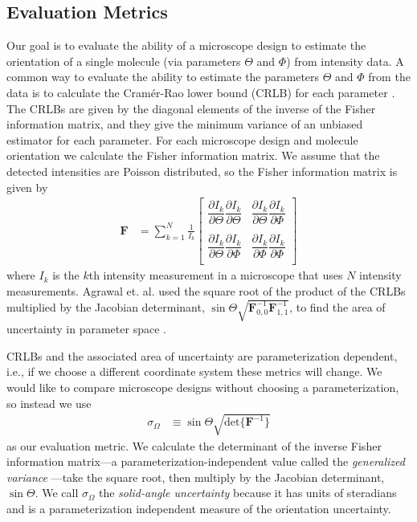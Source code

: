 \documentclass[10pt]{article}
\providecommand{\mb}[1]{\mathbf{#1}}
\begin{document}
\subsection{Evaluation Metrics}\label{metrics}
Our goal is to evaluate the ability of a microscope design to estimate the
orientation of a single molecule (via parameters $\Theta$ and $\Phi$) from
intensity data. A common way to evaluate the ability to estimate the parameters
$\Theta$ and $\Phi$ from the data is to calculate the Cram\'er-Rao lower bound
(CRLB) for each parameter \cite{kay1993}. The CRLBs are given by the diagonal
elements of the inverse of the Fisher information matrix, and they give the
minimum variance of an unbiased estimator for each parameter. For each
microscope design and molecule orientation we calculate the Fisher information
matrix. We assume that the detected intensities are Poisson distributed, so the
Fisher information matrix is given by
\begin{align}
  \mb{F} &= \sum_{k=1}^N \frac{1}{I_k}
  \begin{bmatrix}
    \dfrac{\partial I_k}{\partial \Theta}\dfrac{\partial I_k}{\partial \Theta}&\dfrac{\partial I_k}{\partial \Theta}\dfrac{\partial I_k}{\partial \Phi}\\\\
    \dfrac{\partial I_k}{\partial \Theta}\dfrac{\partial I_k}{\partial \Phi}&\dfrac{\partial I_k}{\partial \Phi}\dfrac{\partial I_k}{\partial \Phi}\\    
  \end{bmatrix}
\end{align}
where $I_k$ is the $k$th intensity measurement in a microscope that uses $N$
intensity measurements. Agrawal et. al. used the square root of the product of
the CRLBs multiplied by the Jacobian determinant,
$\sin\Theta\sqrt{\mb{F}^{-1}_{0,0}\mb{F}^{-1}_{1,1}}$, to find the area of
uncertainty in parameter space \cite{agrawal2012}.

CRLBs and the associated area of uncertainty are parameterization dependent,
i.e., if we choose a different coordinate system these metrics will change. We
would like to compare microscope designs without choosing a parameterization, so
instead we use
\begin{align}
  \sigma_{\Omega} &\equiv \sin\Theta\sqrt{\text{det}\{\mb{F}^{-1}\}}
\end{align}
as our evaluation metric. We calculate the determinant of the inverse Fisher
information matrix---a parameterization-independent value called the
\emph{generalized variance} \cite{anderson1958}---take the square root, then
multiply by the Jacobian determinant, $\sin\Theta$. We call $\sigma_{\Omega}$
the \emph{solid-angle uncertainty} because it has units of steradians and is a
parameterization independent measure of the orientation uncertainty.
\end{document}

